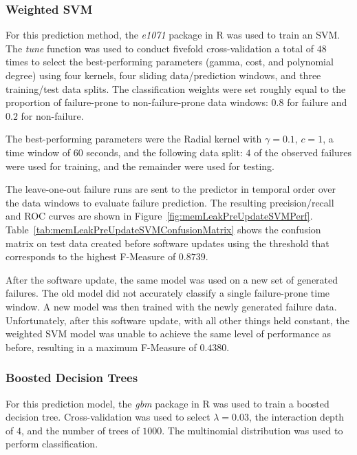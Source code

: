 \subsubsection{Weighted \ac{SVM}}
For this prediction method, the \emph{e1071} package in R was used to train an
\ac{SVM}.  The \emph{tune} function was used to conduct fivefold
cross-validation a total of $48$ times to select the best-performing parameters
(gamma, cost, and polynomial degree) using four kernels, four sliding
data/prediction windows, and three training/test data splits.  The
classification weights were set roughly equal to the proportion of
failure-prone to non-failure-prone data windows: $0.8$ for failure and $0.2$
for non-failure.

The best-performing parameters were the Radial kernel with $\gamma = 0.1$, $c =
1$, a time window of $60$ seconds, and the following data split: $4$ of the
observed failures were used for training, and the remainder were used for
testing.

The leave-one-out failure runs are sent to the predictor in temporal order over
the data windows to evaluate failure prediction.  The resulting
precision/recall and \ac{ROC} curves are shown in
Figure~\ref{fig:memLeakPreUpdateSVMPerf}.
Table~\ref{tab:memLeakPreUpdateSVMConfusionMatrix} shows the confusion matrix
on test data  created before software updates using the threshold that
corresponds to the highest F-Measure of $0.8739$. 

\figMemLeakPreUpdateSVMPerf
\tabMemLeakPreUpdateSVMConfusionMatrix

After the software update, the same model was used on a new set of generated
failures.  The old model did not accurately classify a single failure-prone
time window.  A new model was then trained with the newly generated failure
data.  Unfortunately, after this software update, with all other things held
constant, the weighted SVM model was unable to achieve the same level of
performance as before, resulting in a maximum F-Measure of $0.4380$.

\subsubsection{Boosted Decision Trees}
For this prediction model, the \emph{gbm} package in R was used to train a
boosted decision tree.  Cross-validation was used to select $\lambda = 0.03$,
the interaction depth of $4$, and the number of trees of $1000$.  The
multinomial distribution was used to perform classification.

